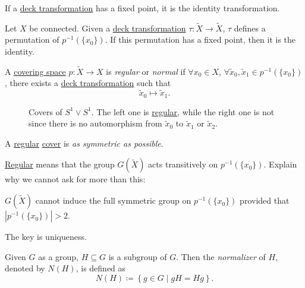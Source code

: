 \begin{corollary}
	If a \hyperref[def:deck-transformation]{deck transformation} has a fixed point, it is the identity transformation.
\end{corollary}

\begin{exercise}
	Let \(X\) be connected. Given a \hyperref[def:deck-transformation]{deck transformation} \(\tau \colon \widetilde{X} \to \widetilde{X} \), \(\tau \)
	defines a permutation of \(p^{-1} (\{x_0\})\). If this permutation has a fixed point, then it is the identity.
\end{exercise}

\begin{definition}\label{def:regular}\label{def:normal}
	A \hyperref[def:covering-space]{covering space} \(p\colon \widetilde{X} \to X\) is \emph{regular} or \emph{normal}
	if \(\forall x_0\in X\), \(\forall \widetilde{x}_0, \widetilde{x} _1 \in p^{-1} (\{x_0\})\), there exists
	a \hyperref[def:deck-transformation]{deck transformation} such that
	\[
		\widetilde{x} _0 \mapsto \widetilde{x} _1.
	\]
\end{definition}
\begin{figure}[H]
	\centering
	\caption{Covers of \(S^1\vee S^1\). The left one is \hyperref[def:regular]{regular}, while the right one is not since there is no
		automorphism from \(\widetilde{x} _0\) to \(\widetilde{x} _1\) or \(\widetilde{x} _2\).}
	\label{fig:eg:lec17:regular}
\end{figure}
\begin{remark}
	A \hyperref[def:regular]{regular} \hyperref[def:covering-map]{cover} is \emph{as symmetric as possible}.
\end{remark}

\begin{exercise}
	\hyperref[def:regular]{Regular} means that the group \(G(\widetilde{X} )\) acts transitively on \(p^{-1} (\{x_0\})\). Explain why we cannot ask for
	more than this:
	\begin{center}
		\(G(\widetilde{X})\) cannot induce the full symmetric group on \(p^{-1} (\{x_0\})\) provided that \(\left\vert p^{-1} (\{x_0\}) \right\vert > 2\).
	\end{center}
\end{exercise}
\begin{answer}
	The key is uniqueness.
\end{answer}

\begin{definition}[Normalizer]\label{def:normalizer}
	Given \(G\) as a group, \(H\subseteq G\) is a subgroup of \(G\). Then the \emph{normalizer} of \(H\), denoted by \(N(H)\), is defined as
	\[
		N(H) \coloneqq \left\{g\in G \mid gH = H g\right\}.
	\]
\end{definition}

